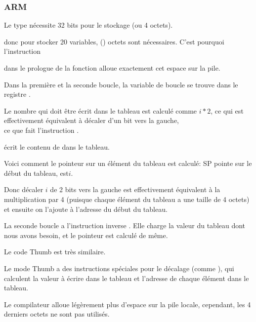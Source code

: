 \subsubsection{ARM}

\myparagraph{\NonOptimizingKeilVI (\ARMMode)}



Le type \Tint nécessite 32 bits pour le stockage (ou 4 octets).

donc pour stocker 20 variables,  () octets sont nécessaires.
C'est pourquoi l'instruction 

dans le prologue de la fonction alloue exactement cet espace sur la pile.

Dans la première et la seconde boucle, la variable de boucle  se trouve dans
le registre .


Le nombre qui doit être écrit dans le tableau est calculé comme $i*2$, ce qui est
effectivement équivalent à décaler d'un bit vers la gauche,\\
ce que fait l'instruction .

 écrit le contenu de  dans le tableau.

Voici comment le pointeur sur un élément du tableau est calculé: \ac{SP} pointe sur
le début du tableau,  est$i$.

Donc décaler $i$ de 2 bits vers la gauche est effectivement équivalent à la multiplication
par 4 (puisque chaque élément du tableau a une taille de 4 octets) et ensuite on
l'ajoute à l'adresse du début du tableau.


La seconde boucle a l'instruction inverse . Elle charge
la valeur du tableau dont nous avons besoin, et le pointeur est calculé de même.

\myparagraph{\OptimizingKeilVI (\ThumbMode)}



Le code Thumb est très similaire.

Le mode Thumb a des instructions spéciales pour le décalage (comme ), qui
calculent la valeur à écrire dans le tableau et l'adresse de chaque élément dans le
tableau.

Le compilateur alloue légèrement plus d'espace sur la pile locale, cependant, les
4 derniers octets ne sont pas utilisés.




